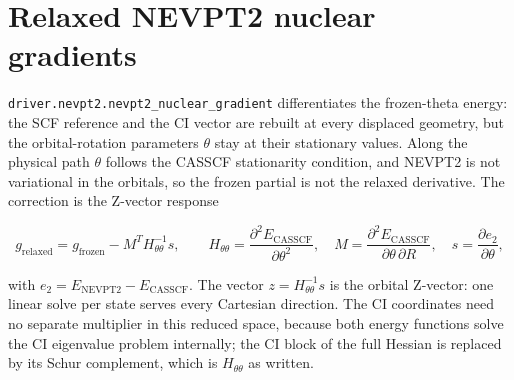 \section{Relaxed NEVPT2 nuclear gradients}
\label{sec:new-nevpt2-zvector}

\texttt{driver.nevpt2.nevpt2\_nuclear\_gradient} differentiates the
frozen-theta energy: the SCF reference and the CI vector are rebuilt at
every displaced geometry, but the orbital-rotation parameters
$\theta$ stay at their stationary values.  Along the physical path
$\theta$ follows the CASSCF stationarity condition, and NEVPT2 is not
variational in the orbitals, so the frozen partial is not the relaxed
derivative.  The correction is the Z-vector response

\begin{equation}
  g_{\mathrm{relaxed}} = g_{\mathrm{frozen}} - M^{T} H_{\theta\theta}^{-1} s,
  \qquad
  H_{\theta\theta} = \frac{\partial^2 E_{\mathrm{CASSCF}}}
    {\partial\theta^{2}}, \quad
  M = \frac{\partial^2 E_{\mathrm{CASSCF}}}
    {\partial\theta\,\partial R}, \quad
  s = \frac{\partial e_2}{\partial\theta},
  \label{eq:new-zvector}
\end{equation}

with $e_2 = E_{\mathrm{NEVPT2}} - E_{\mathrm{CASSCF}}$.  The vector
$z = H_{\theta\theta}^{-1} s$ is the orbital Z-vector: one linear solve
per state serves every Cartesian direction.  The CI coordinates need no
separate multiplier in this reduced space, because both energy
functions solve the CI eigenvalue problem internally; the CI block of
the full Hessian is replaced by its Schur complement, which is
$H_{\theta\theta}$ as written.

